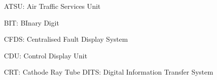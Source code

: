 	ATSU: Air Traffic Services Unit%



	BIT: BInary Digit


	CFDS: Centralised Fault Display System


	CDU: Control Display Unit

	CRT: Cathode Ray Tube
	DITS: Digital Information Transfer System

